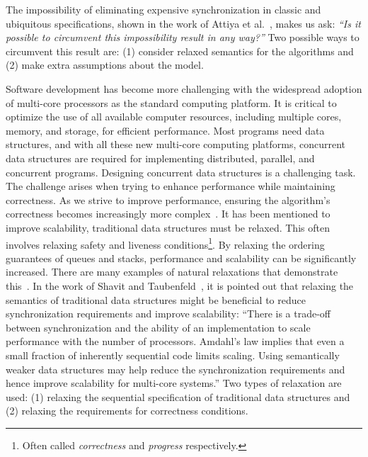 The impossibility of eliminating expensive synchronization in classic and ubiquitous specifications, shown in the work of Attiya et al.~\cite{DBLP_conf_popl_AttiyaGHKMV11}, makes us ask: \textit{``Is it possible to circumvent this impossibility result in any way?''} Two possible ways to circumvent this result are: (1) consider relaxed semantics for the algorithms and (2) make extra assumptions about the model. 

Software development has become more challenging with the widespread adoption of multi-core processors as the standard computing platform. It is critical to optimize the use of all available computer resources, including multiple cores, memory, and storage, for efficient performance. Most programs need data structures, and with all these new multi-core computing platforms, concurrent data structures are required for implementing distributed, parallel, and concurrent programs. Designing concurrent data structures is a challenging task. The challenge arises when trying to enhance performance while maintaining correctness. As we strive to improve performance, ensuring the algorithm's correctness becomes increasingly more complex~\cite{DBLP_journals_cacm_Shavit11}. It has been mentioned to improve scalability, traditional data structures must be relaxed. This often involves relaxing safety and liveness conditions\footnote{Often called \textit{correctness} and \textit{progress} respectively.}. By relaxing the ordering guarantees of queues and stacks, performance and scalability can be significantly increased. There are many examples of natural relaxations that demonstrate this~\cite{DBLP_journals_cacm_Shavit11}. In the work of Shavit and Taubenfeld~\cite{DBLP_journals_dc_ShavitT16}, it is pointed out that relaxing the semantics of traditional data structures might be beneficial to reduce synchronization requirements and improve scalability: ``There is a trade-off between synchronization and the ability of an implementation to scale performance with the number of processors. Amdahl’s law implies that even a small fraction of inherently sequential code limits scaling. Using semantically weaker data structures may help reduce the synchronization requirements and hence improve scalability for multi-core systems.''
Two types of relaxation are used: (1) relaxing the sequential specification of traditional data structures and (2) relaxing the requirements for correctness conditions. 

